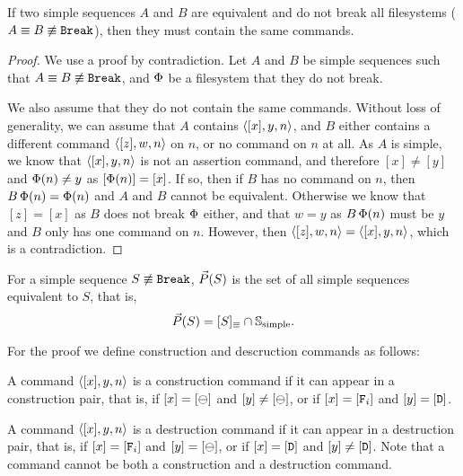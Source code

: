 \begin{mylem}\label{equiv_simple_same_commands}
If two simple sequences $A$ and $B$ are equivalent
and do not break all filesystems ($A\equiv B\not\equiv\mathtt{Break}$),
then they must contain the same commands.
\end{mylem}
\begin{proof}
We use a proof by contradiction. Let $A$ and $B$ be simple sequences
such that $A\equiv B\not\equiv\mathtt{Break}$,
and $\Phi$ be a filesystem that they do not break.

We also assume that they do not contain the same commands.
Without loss of generality, we can assume
that $A$
contains $\langle{[x],y,n}\rangle$, and $B$ either contains a different command
$\langle{[z],w,n}\rangle$ on $n$, or no command on $n$ at all.
As $A$ is simple, we know that $\langle{[x],y,n}\rangle$ is not an assertion command,
and therefore $[x]\neq [y]$ and $\Phi(n)\neq y$ as $[\Phi(n)]=[x]$.
If so, then if $B$ has no command on $n$, then $B\,\Phi(n)=\Phi(n)$ and
$A$ and $B$ cannot be equivalent.
Otherwise we know that $[z]=[x]$ as $B$ does not break $\Phi$ either,
and that $w=y$ as $B\,\Phi(n)$ must
be $y$ and $B$ only has one command on $n$.
However, then $\langle{[z],w,n}\rangle=\langle{[x],y,n}\rangle$, which is a contradiction.
\end{proof}



\begin{mylem}\label{simple_reorder_equiv}
For a simple sequence $S\not\equiv\mathtt{Break}$,
$\vec{P}({S})$ is the set of all simple sequences equivalent to $S$, that is,
\[ \vec{P}({S}) = [S]_\equiv \cap \mathbb{S}_{\mathrm{simple}}. \]
\end{mylem}

For the proof we define construction and descruction commands as follows:
\begin{mydef}
A command $\langle{[x],y,n}\rangle$ is a construction command if it can appear in a construction pair,
that is, if $[x]=[\ominus]$ and $[y]\neq[\ominus]$,
or if $[x]=[\mathtt{F}_i]$ and $[y]=[\mathtt{D}]$.
\end{mydef}
\begin{mydef}
A command $\langle{[x],y,n}\rangle$ is a destruction command if it can appear in a destruction pair,
that is, 
if $[x]=[\mathtt{F}_i]$ and $[y]=[\ominus]$,
or if $[x]=[\mathtt{D}]$ and $[y]\neq[\mathtt{D}]$.
Note that a command cannot be both a construction and a destruction command.
\end{mydef}


